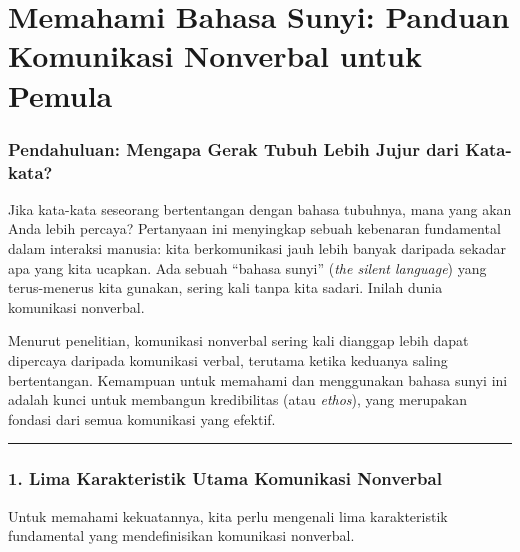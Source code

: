 \documentclass[
  letterpaper,
  DIV=11,
  numbers=noendperiod]{scrreprt}
\begin{document}

\chapter{Memahami Bahasa Sunyi: Panduan Komunikasi Nonverbal untuk
Pemula}\label{memahami-bahasa-sunyi-panduan-komunikasi-nonverbal-untuk-pemula-1}

\subsection{Pendahuluan: Mengapa Gerak Tubuh Lebih Jujur dari
Kata-kata?}\label{pendahuluan-mengapa-gerak-tubuh-lebih-jujur-dari-kata-kata-1}

Jika kata-kata seseorang bertentangan dengan bahasa tubuhnya, mana yang
akan Anda lebih percaya? Pertanyaan ini menyingkap sebuah kebenaran
fundamental dalam interaksi manusia: kita berkomunikasi jauh lebih
banyak daripada sekadar apa yang kita ucapkan. Ada sebuah ``bahasa
sunyi'' (\emph{the silent language}) yang terus-menerus kita gunakan,
sering kali tanpa kita sadari. Inilah dunia komunikasi nonverbal.

Menurut penelitian, komunikasi nonverbal sering kali dianggap lebih
dapat dipercaya daripada komunikasi verbal, terutama ketika keduanya
saling bertentangan. Kemampuan untuk memahami dan menggunakan bahasa
sunyi ini adalah kunci untuk membangun kredibilitas (atau \emph{ethos}),
yang merupakan fondasi dari semua komunikasi yang efektif.

\begin{center}\rule{0.5\linewidth}{0.5pt}\end{center}

\subsection{1. Lima Karakteristik Utama Komunikasi
Nonverbal}\label{lima-karakteristik-utama-komunikasi-nonverbal-1}

Untuk memahami kekuatannya, kita perlu mengenali lima karakteristik
fundamental yang mendefinisikan komunikasi nonverbal.
\end{document}
